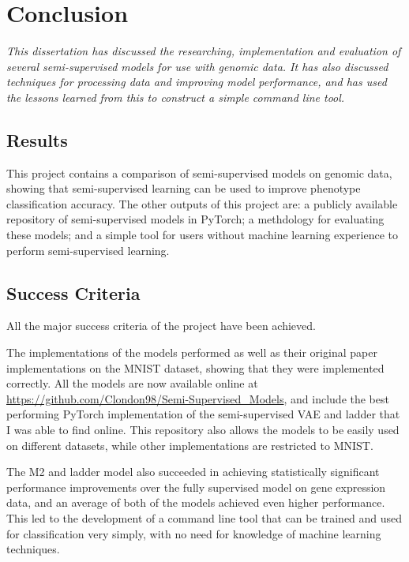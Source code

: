 \chapter{Conclusion}

\textit{This dissertation has discussed the researching, implementation and evaluation of several semi-supervised models for use with genomic
data. It has also discussed techniques for processing data and improving model performance, and has used the lessons learned from 
this to construct a simple command line tool.}

\section{Results}

This project contains a comparison of semi-supervised models on genomic data, showing that semi-supervised learning can be used to 
improve phenotype classification accuracy. The other outputs of this project are: a publicly available repository of semi-supervised models in PyTorch; 
a methdology for evaluating these models; and a simple tool for users without machine learning experience to perform semi-supervised 
learning.

\section{Success Criteria}

All the major success criteria of the project have been achieved. 

The implementations of the models performed as well as their original paper implementations on the MNIST dataset, showing that they were 
implemented correctly. All the models are now available online at \url{https://github.com/Clondon98/Semi-Supervised_Models}, and include the 
best performing PyTorch implementation of the semi-supervised VAE and ladder that I was able to find online. This repository also allows 
the models to be easily used on different datasets, while other implementations are restricted to MNIST. 

The M2 and ladder model also succeeded in achieving statistically significant performance improvements over the fully supervised model on 
gene expression data, and an average of both of the models achieved even higher performance. This led to the development of a 
command line tool that can be trained and used for classification very simply, with no need for knowledge of machine learning techniques.

